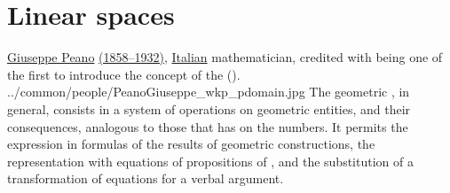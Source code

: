 \chapter{Linear spaces}
\qboxnpq
  {\href{http://en.wikipedia.org/wiki/Giuseppe_Peano}{Giuseppe Peano}
   \href{http://www-history.mcs.st-andrews.ac.uk/Timelines/TimelineF.html}{(1858--1932)},
   \href{http://www-history.mcs.st-andrews.ac.uk/BirthplaceMaps/Places/Italy.html}{Italian} mathematician,
   credited with being one of the first to introduce the concept of the  ().\footnotemark}
  {../common/people/PeanoGiuseppe_wkp_pdomain.jpg}
  {The geometric , in general,
   consists in a system of operations on geometric entities, and their consequences,
   analogous to those that  has on the numbers.
   It permits the expression in formulas of the results of geometric constructions,
   the representation with equations of propositions of ,
   and the substitution of a transformation of equations for a verbal argument.}


